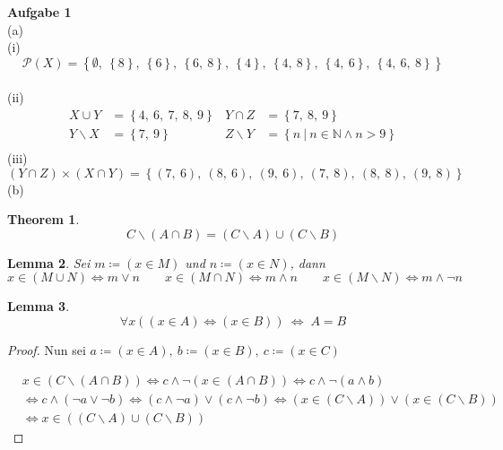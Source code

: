 \documentclass[a4paper, 12pt]{scrartcl}
\theoremstyle{plain}
\newtheorem{theorem}{Theorem}
\newtheorem{lemma}[theorem]{Lemma}
\begin{document}
\textbf{Aufgabe 1}\\
(a)\\
(i)
\[ \mathcal{P}(X) = \left\{ \emptyset,
\ \left\{  8 \right\},
\ \left\{  6 \right\},
\ \left\{  6,\ 8 \right\},
\ \left\{ 4 \right\},
\ \left\{ 4,\ 8 \right\},
\ \left\{ 4,\ 6 \right\},
\ \left\{ 4,\ 6,\ 8 \right\}
 \right\} \]\\
(ii)
\begin{align*}
	X \cup Y &= \left\{ 4,\ 6,\ 7, \ 8,\ 9 \right\} & Y \cap Z &= \left\{ 7,\ 8,\ 9 \right\} \\ Y \backslash X &= \left\{ 7,\ 9 \right\} & Z \backslash Y &= \left\{ n \:\vert\: n \in \mathbb{N} \wedge n > 9 \right\} \\
\end{align*}
(iii) \[ (Y \cap Z) \times (X \cap Y) =  \left\{ (7, \ 6),\ (8, \ 6),\ (9, \ 6),\ (7, \ 8),\ (8, \ 8),\ (9, \ 8) \right\} \]
(b)\\
\begin{theorem}
	\[ C \backslash (A \cap B) = (C \backslash A) \cup (C \backslash B) \]
\end{theorem}
\begin{lemma}
Sei $ m \coloneqq (x \in M)$ und  $n \coloneqq (x \in N)$, dann
\[ x \in (M \cup N) \Leftrightarrow m \vee n \qquad x \in (M \cap N) \Leftrightarrow m \wedge n \qquad x  \in (M \backslash N) \Leftrightarrow m \wedge \neg n \]
\end{lemma}
\begin{lemma}
\[ \forall x ((x \in A) \Leftrightarrow (x \in B)) \:\Leftrightarrow\; A = B \]
\end{lemma}

\begin{proof}
	
Nun sei $a \coloneqq (x \in A), \ b \coloneqq (x \in B), \ c \coloneqq (x \in C)$

\begin{align*}
	&x \in (C \backslash (A \cap B)) \Leftrightarrow c \wedge \neg(x \in (A \cap B)) \Leftrightarrow c \wedge \neg(a \wedge b) \\
	&\Leftrightarrow c \wedge (\neg a \vee \neg b) \Leftrightarrow (c \wedge \neg a) \vee (c \wedge \neg b) \Leftrightarrow (x \in (C \backslash A)) \vee (x \in (C \backslash B)) \\
	&\Leftrightarrow x \in ((C \backslash A) \cup (C \backslash B))
\end{align*}
\end{proof}
\end{document}
